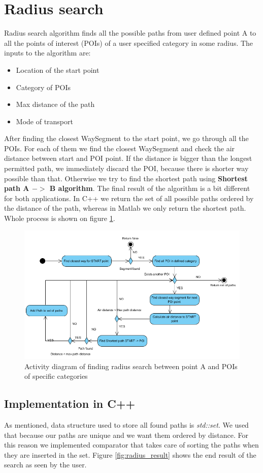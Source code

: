 \section{Radius search}
Radius search algorithm finds all the possible paths from user defined point A to all the points of interest (POIs) of a user specified category in some radius. The inputs to the algorithm are:
\begin{itemize}
\item Location of the start point
\item Category of POIs
\item Max distance of the path
\item Mode of transport
\end{itemize}
After finding the closest WaySegment to the start point, we go through all the POIs. For each of them we find the closest WaySegment and check the air distance between start and POI point. If the distance is bigger than the longest permitted path, we immediately discard the POI, because there is shorter way possible than that. Otherwise we try to find the shortest path using \textbf{Shortest path A $->$ B algorithm}. The final result of the algorithm is a bit different for both applications. In C++ we return the set of all possible paths ordered by the distance of the path, whereas in Matlab we only return the shortest path. Whole process is shown on figure \ref{fig:radius_activity}.    
 \begin{figure}[h]
 \centering
 \includegraphics[width=0.8\linewidth]{../pictures/shortest_path_radius.png}
 \caption{Activity diagram of finding radius search between point A and POIs of specific categories}
 \label{fig:radius_activity}
 \end{figure}
 \subsection{Implementation in C++}
 As mentioned, data structure used to store all found paths is \textit{std::set}. We used that because our paths are unique and we want them ordered by distance. For this reason we implemented comparator that takes care of sorting the paths when they are inserted in the set. Figure \ref{fig:radius_result} shows the end result of the search as seen by the user.
 
